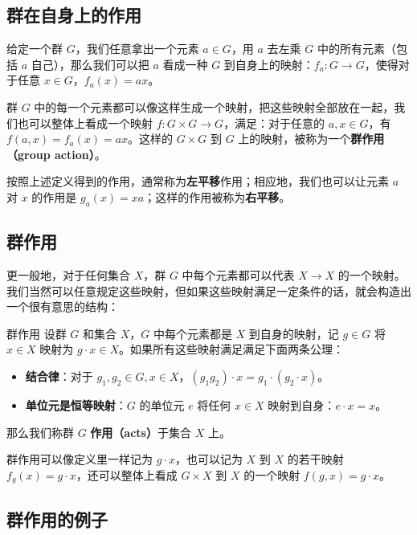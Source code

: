 
\subsection{群在自身上的作用}

给定一个群 $G$，我们任意拿出一个元素 $a\in G$，用 $a$ 去左乘 $G$ 中的所有元素（包括 $a$ 自己），那么我们可以把 $a$ 看成一种 $G$ 到自身上的映射：$f_a:G\rightarrow G$，使得对于任意 $x\in G$，$f_a(x)=ax$。

群 $G$ 中的每一个元素都可以像这样生成一个映射，把这些映射全部放在一起，我们也可以整体上看成一个映射 $f:G\times G\rightarrow G$，满足：对于任意的 $a, x\in G$，有 $f(a,x)=f_a(x)=ax$。这样的 $G\times G$ 到 $G$ 上的映射，被称为一个\textbf{群作用（group action）}。

按照上述定义得到的作用，通常称为\textbf{左平移}作用；相应地，我们也可以让元素 $a$ 对 $x$ 的作用是 $g_a(x)=xa$；这样的作用被称为\textbf{右平移}。

\subsection{群作用}

更一般地，对于任何集合 $X$，群 $G$ 中每个元素都可以代表 $X\rightarrow X$ 的一个映射。我们当然可以任意规定这些映射，但如果这些映射满足一定条件的话，就会构造出一个很有意思的结构：

\begin{definition}{群作用}\label{def_Group3_1}
设群 $G$ 和集合 $X$，$G$ 中每个元素都是 $X$ 到自身的映射，记 $g\in G$ 将 $x\in X$ 映射为 $g\cdot x\in X$。如果所有这些映射满足满足下面两条公理：
\begin{itemize}
\item \textbf{结合律}：对于 $g_1, g_2\in G, x\in X$，$(g_1 g_2)\cdot x=g_1\cdot (g_2\cdot x)$。
\item \textbf{单位元是恒等映射}：$G$ 的单位元 $e$ 将任何 $x\in X$ 映射到自身：$e\cdot x=x$。
\end{itemize}

那么我们称群 $G$ \textbf{作用（acts）}于集合 $X$ 上。

\end{definition}

群作用可以像定义里一样记为 $g\cdot x$，也可以记为 $X$ 到 $X$ 的若干映射 $f_g(x)=g\cdot x$，还可以整体上看成 $G\times X$ 到 $X$ 的一个映射 $f(g, x)=g\cdot x$。

\subsection{群作用的例子}

